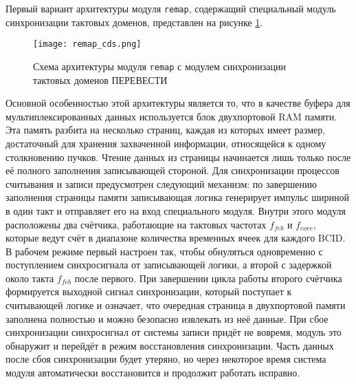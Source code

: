 Первый вариант архитектуры модуля \texttt{remap}, содержащий специальный модуль синхронизации тактовых доменов, представлен на рисунке \ref{fig:remap_cds}.\par
\begin{figure}[ht]
    \centering
    \texttt{[image: remap\_cds.png]}
    \caption{Схема архитектуры модуля \texttt{remap} с модулем синхронизации тактовых доменов ПЕРЕВЕСТИ}
    \label{fig:remap_cds}
\end{figure}\par
Основной особенностью этой архитектуры является то, что в качестве буфера для мультиплексированных данных используется блок двухпортовой RAM памяти. Эта память разбита на несколько страниц, каждая из которых имеет размер, достаточный для хранения захваченной информации, относящейся к одному столкновению пучков. Чтение данных из страницы начинается лишь только после её полного заполнения записывающей стороной. Для синхронизации процессов считывания и записи предусмотрен следующий механизм: по завершению заполнения страницы памяти записывающая логика генерирует импульс шириной в один такт и отправляет его на вход специального модуля. Внутри этого модуля расположены два счётчика, работающие на тактовых частотах $f_{feb}$ и $f_{core}$, которые ведут счёт в диапазоне количества временных ячеек для каждого BCID. В рабочем режиме первый настроен так, чтобы обнуляться одновременно с поступлением синхросигнала от записывающей логики, а второй с задержкой около такта $f_{feb}$ после первого. При завершении цикла работы второго счётчика формируется выходной сигнал синхронизации, который поступает к считывающей логике и означает, что очередная страница в двухпортовой памяти заполнена полностью и можно безопасно извлекать из неё данные. При сбое синхронизации синхросигнал от системы записи придёт не вовремя, модуль это обнаружит и перейдёт в режим восстановления синхронизации. Часть данных после сбоя синхронизации будет утеряно, но через некоторое время система модуля автоматически восстановится и продолжит работать исправно.\par
